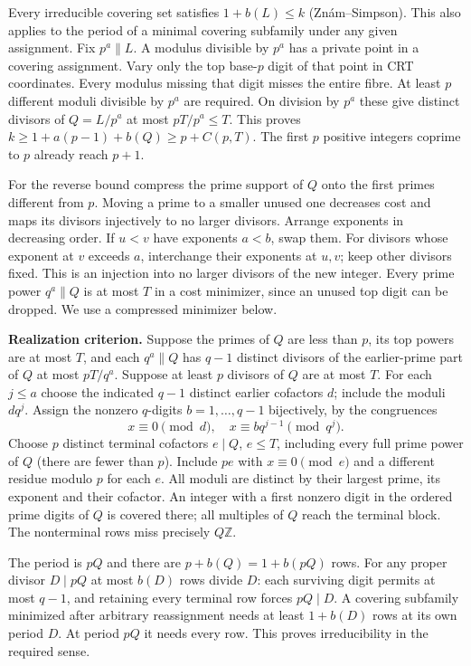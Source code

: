 \documentclass[11pt]{article}
\newcommand{\head}[1]{\par\vspace{5pt}{\large\bfseries #1}\par}
\begin{document}
\newpage
\head{1. Why the inverse problem is arithmetic}
Every irreducible covering set satisfies $1+b(L)\le k$ (Zn\'am--Simpson). This also applies to the period of a minimal covering subfamily under any given assignment. Fix $p^a\parallel L$. A modulus divisible by $p^a$ has a private point in a covering assignment. Vary only the top base-$p$ digit of that point in CRT coordinates. Every modulus missing that digit misses the entire fibre. At least $p$ different moduli divisible by $p^a$ are required. On division by $p^a$ these give distinct divisors of $Q=L/p^a$ at most $pT/p^a\le T$. This proves $k\ge1+a(p-1)+b(Q)\ge p+C(p,T)$. The first $p$ positive integers coprime to $p$ already reach $p+1$.

For the reverse bound compress the prime support of $Q$ onto the first primes different from $p$. Moving a prime to a smaller unused one decreases cost and maps its divisors injectively to no larger divisors. Arrange exponents in decreasing order. If $u<v$ have exponents $a<b$, swap them. For divisors whose exponent at $v$ exceeds $a$, interchange their exponents at $u,v$; keep other divisors fixed. This is an injection into no larger divisors of the new integer. Every prime power $q^a\parallel Q$ is at most $T$ in a cost minimizer, since an unused top digit can be dropped. We use a compressed minimizer below.

\textbf{Realization criterion.} Suppose the primes of $Q$ are less than $p$, its top powers are at most $T$, and each $q^a\parallel Q$ has $q-1$ distinct divisors of the earlier-prime part of $Q$ at most $pT/q^a$. Suppose at least $p$ divisors of $Q$ are at most $T$. For each $j\le a$ choose the indicated $q-1$ distinct earlier cofactors $d$; include the moduli $dq^j$. Assign the nonzero $q$-digits $b=1,\ldots,q-1$ bijectively, by the congruences
\[
                 x\equiv0\pmod d,\quad x\equiv bq^{j-1}\pmod {q^j}.
\]
Choose $p$ distinct terminal cofactors $e\mid Q$, $e\le T$, including every full prime power of $Q$ (there are fewer than $p$). Include $pe$ with $x\equiv0\pmod e$ and a different residue modulo $p$ for each $e$. All moduli are distinct by their largest prime, its exponent and their cofactor. An integer with a first nonzero digit in the ordered prime digits of $Q$ is covered there; all multiples of $Q$ reach the terminal block. The nonterminal rows miss precisely $Q\mathbb Z$.

The period is $pQ$ and there are $p+b(Q)=1+b(pQ)$ rows. For any proper divisor $D\mid pQ$ at most $b(D)$ rows divide $D$: each surviving digit permits at most $q-1$, and retaining every terminal row forces $pQ\mid D$. A covering subfamily minimized after arbitrary reassignment needs at least $1+b(D)$ rows at its own period $D$. At period $pQ$ it needs every row. This proves irreducibility in the required sense.
\end{document}
